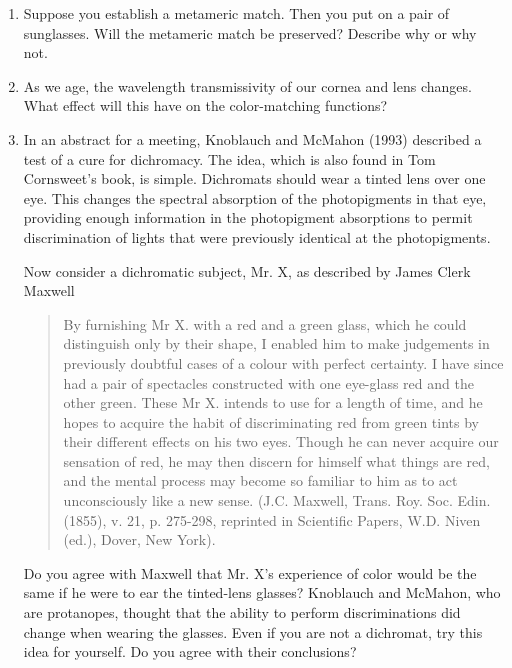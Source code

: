 \begin{enumerate}
 \item Suppose you establish a metameric match.
Then you put on a pair of sunglasses.
Will the metameric match be preserved?
Describe why or why not.

 \item As we age, the wavelength transmissivity of our cornea
and lens changes.
What effect will this have on the color-matching functions?

 \ee

\item In an abstract for a meeting, Knoblauch and McMahon (1993)
described a test of a cure for dichromacy.
The idea, which is also found in Tom Cornsweet's book, is simple.
Dichromats should wear a tinted lens over one eye.
This changes the spectral absorption of the photopigments in that
eye, providing enough information in the photopigment absorptions
to permit discrimination of lights that were previously identical
at the photopigments.

Now consider a dichromatic subject, Mr. X, as described by
James Clerk Maxwell
\begin{quote}
By furnishing Mr X. with a red and a green glass, which he could
distinguish only by their shape, I enabled him to make judgements in
previously doubtful cases of a colour with perfect certainty.  I have
since had a pair of spectacles constructed with one eye-glass red and
the other green.  These Mr X. intends to use for a length of time, and
he hopes to acquire the habit of discriminating red from green tints
by their different effects on his two eyes.  Though he can never
acquire our sensation of red, he may then discern for himself what
things are red, and the mental process may become so familiar to him
as to act unconsciously like a new sense. (J.C. Maxwell, Trans. Roy.
Soc. Edin. (1855), v. 21, p. 275-298, reprinted in Scientific Papers,
W.D. Niven (ed.), Dover, New York).
\end{quote}

Do you agree with Maxwell that Mr. X's experience of color
would be the same if he were to ear the tinted-lens glasses?
Knoblauch and McMahon, who are protanopes,
thought that the ability to perform discriminations did change
when wearing the glasses.
Even if you are not a dichromat, try this idea for yourself.
Do you agree with their conclusions?

\end{enumerate}  %

